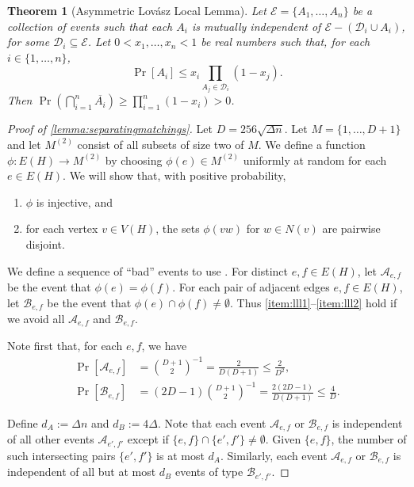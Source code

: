 \documentclass[a4paper, 11pt,reqno]{amsart}
\theoremstyle{plain}
\newtheorem{theorem}{Theorem}[section]
\theoremstyle{definition}
\numberwithin{equation}{section}
\DeclareMathOperator{\probability}{Pr}
\begin{document}
\begin{theorem}[Asymmetric Lovász Local Lemma] \label{theorem:ALLL}
  Let $\mathcal{E} = \{A_1, \dotsc, A_n\}$ be a collection of events
  such that each $A_i$ is mutually independent of $\mathcal{E} -
  (\mathcal{D}_i \cup A_i)$, for some $\mathcal{D}_i \subseteq
  \mathcal{E}$.  Let $0 < x_1, \dotsc, x_n < 1$ be real numbers such
  that, for each $i \in \{1, \dotsc, n\}$,
  \begin{equation}
    \probability[A_i] \leq x_i \prod_{A_j \in \mathcal{D}_i}(1 - x_j).
    \label{equation:lll}
  \end{equation}
  Then $\probability\left( \bigcap_{i=1}^n \overline{A_i} \right) \geq
  \prod_{i=1}^n (1 - x_i) > 0$.
\end{theorem}

\begin{proof}[Proof of \cref{lemma:separatingmatchings}]
  Let $D = 256 \sqrt{\Delta n}$.  Let $M = \{ 1, \dotsc, D+1 \}$ and
  let $M^{(2)}$ consist of all subsets of size two of $M$.  We define
  a function $\phi: E(H) \rightarrow M^{(2)}$ by choosing $\phi(e) \in
  M^{(2)}$ uniformly at random for each $e \in E(H)$.  We will show
  that, with positive probability,
  \begin{enumerate}
  	\item \label{item:lll1} $\phi$ is injective, and
  	\item \label{item:lll2} for each vertex $v \in V(H)$, the sets
  	$\phi(vw)$ for $w \in N(v)$ are pairwise disjoint.
  \end{enumerate}
  We define a sequence of ``bad'' events to use .
  For distinct $e, f \in E(H)$, let $\mathcal{A}_{e,f}$ be the event
  that $\phi(e) = \phi(f)$.  For each pair of adjacent edges $e, f \in
  E(H)$, let $\mathcal{B}_{e,f}$ be the event that $\phi(e) \cap
  \phi(f) \neq \emptyset$.  Thus \ref{item:lll1}--\ref{item:lll2} hold
  if we avoid all $\mathcal{A}_{e,f}$ and $\mathcal{B}_{e,f}$.
  
  Note first that, for each $e, f$, we have 
  \begin{align*}
  	\probability[\mathcal{A}_{e,f}]
  	& = \binom{D+1}{2}^{-1} = \frac{2}{D(D+1)} \leq \frac{2}{D^2}, \\
  	\probability[\mathcal{B}_{e,f}]
  	& = (2D-1)\binom{D+1}{2}^{-1} = \frac{2(2D-1)}{D(D+1)} \leq \frac{4}{D}.
  \end{align*}
  
  Define $d_A := \Delta n$ and $d_B := 4 \Delta$.  Note that each
  event $\mathcal{A}_{e,f}$ or $\mathcal{B}_{e,f}$ is independent of
  all other events $\mathcal{A}_{e',f'}$ except if $\{e, f\} \cap
  \{e', f'\} \neq \emptyset$.  Given $\{e,f\}$, the number of such
  intersecting pairs $\{e',f'\}$ is at most $d_A$.  Similarly, each event
  $\mathcal{A}_{e,f}$ or $\mathcal{B}_{e,f}$ is independent of all
  but at most $d_B$ events of type $\mathcal{B}_{e',f'}$.
  

\end{proof}
\end{document}
